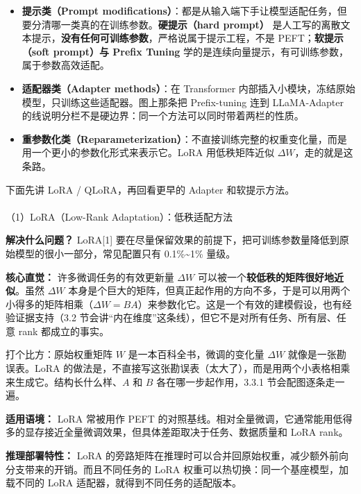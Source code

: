 \documentclass[
  chinese,
]{ctexart}
\makeatletter
\let\oldparagraph\paragraph
\renewcommand{\paragraph}{
    \@ifstar
      \xxxParagraphStar
      \xxxParagraphNoStar
  }
\newcommand{\xxxParagraphStar}[1]{\oldparagraph*{#1}\mbox{}}
\newcommand{\xxxParagraphNoStar}[1]{\oldparagraph{#1}\mbox{}}
\providecommand{\tightlist}{%
  \setlength{\itemsep}{0pt}\setlength{\parskip}{0pt}}
\makeatother
\begin{document}
\begin{itemize}
\tightlist
\item
  \textbf{提示类（Prompt
  modifications）}：都是从输入端下手让模型适配任务，但要分清哪一类真的在训练参数。\textbf{硬提示（hard
  prompt）}
  是人工写的离散文本提示，\textbf{没有任何可训练参数}，严格说属于提示工程，不是
  PEFT；\textbf{软提示（soft prompt）与 Prefix Tuning}
  学的是连续向量提示，有可训练参数，属于参数高效适配。
\item
  \textbf{适配器类（Adapter methods）}：在 Transformer
  内部插入小模块，冻结原始模型，只训练这些适配器。图上那条把
  Prefix-tuning 连到 LLaMA-Adapter
  的线说明分栏不是硬边界：同一个方法可以同时带着两栏的性质。
\item
  \textbf{重参数化类（Reparameterization）}：不直接训练完整的权重变化量，而是用一个更小的参数化形式来表示它。LoRA
  用低秩矩阵近似 \(\Delta W\)，走的就是这条路。
\end{itemize}

下面先讲 LoRA / QLoRA，再回看更早的 Adapter 和软提示方法。

\paragraph{（1）LoRA（Low-Rank
Adaptation）：低秩适配方法}\label{loralow-rank-adaptationux4f4eux79e9ux9002ux914dux65b9ux6cd5}

\textbf{解决什么问题？} LoRA{[}1{]}
要在尽量保留效果的前提下，把可训练参数量降低到原始模型的很小一部分，常见配置只有
0.1\%\textasciitilde1\% 量级。

\textbf{核心直觉：} 许多微调任务的有效更新量 \(\Delta W\)
可以被一个\textbf{较低秩的矩阵很好地近似}。虽然 \(\Delta W\)
本身是个巨大的矩阵，但真正起作用的方向不多，于是可以用两个小得多的矩阵相乘（\(\Delta W = BA\)）来参数化它。这是一个有效的建模假设，也有经验证据支持（3.2
节会讲``内在维度''这条线），但它不是对所有任务、所有层、任意 rank
都成立的事实。

打个比方：原始权重矩阵 \(W\) 是一本百科全书，微调的变化量 \(\Delta W\)
就像是一张勘误表。LoRA
的做法是，不直接写这张勘误表（太大了），而是用两个小表格相乘来生成它。结构长什么样、\(A\)
和 \(B\) 各在哪一步起作用，3.3.1 节会配图逐条走一遍。

\textbf{适用语境：} LoRA 常被用作 PEFT
的对照基线。相对全量微调，它通常能用低得多的显存接近全量微调效果，但具体差距取决于任务、数据质量和
LoRA rank。

\textbf{推理部署特性：} LoRA
的旁路矩阵在推理时可以合并回原始权重，减少额外前向分支带来的开销。而且不同任务的
LoRA 权重可以热切换：同一个基座模型，加载不同的 LoRA
适配器，就得到不同任务的适配版本。
\end{document}
